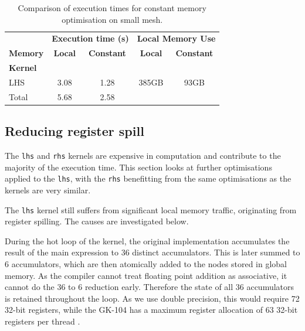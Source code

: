 \documentclass[11pt, oneside, a4paper]{article}
\begin{document}
\begin{table}[tb]
	\caption{Comparison of execution times for constant memory optimisation on small mesh.}
	\label{tab:constMemExeTime}
	\begin{center}
		\begin{tabular}{l|cc|cc}
		\hline

		\hline

		& \multicolumn{2}{c|}{\textbf{Execution time (s)}} & \multicolumn{2}{c}{\textbf{Local Memory Use}} \\
		\textbf{Memory} & \textbf{Local} & \textbf{Constant} & \textbf{Local} & \textbf{Constant} \\
		\hline
			\textbf{Kernel} &&&&\\
			LHS 	& 3.08 	& 1.28 & 385GB & 93GB \\
			Total 	& 5.68 	& 2.58 \\
		\hline

		\hline
		\end{tabular}
	\end{center}
\end{table}


\subsection{Reducing register spill} %
\label{sub:reducing_register_spill}

The \texttt{lhs} and \texttt{rhs} kernels are expensive in computation and contribute to the majority of the execution time. This section looks at further optimisations applied to the \texttt{lhs}, with the \texttt{rhs} benefitting from the same optimisations as the kernels are very similar.

The \texttt{lhs} kernel still suffers from significant local memory traffic, originating from register spilling. The causes are investigated below.

During the hot loop of the kernel, the original implementation accumulates the result of the main expression to 36 distinct accumulators.
This is later summed to 6 accumulators, which are then atomically added to the nodes stored in global memory.
As the compiler cannot treat floating point addition as associative, it cannot do the 36 to 6 reduction early. Therefore the state of all 36 accumulators is retained throughout the loop. As we use double precision, this would require 72 32-bit registers, while the GK-104 has a maximum register allocation of 63 32-bit registers per thread \cite{Progguide}.
\end{document}
